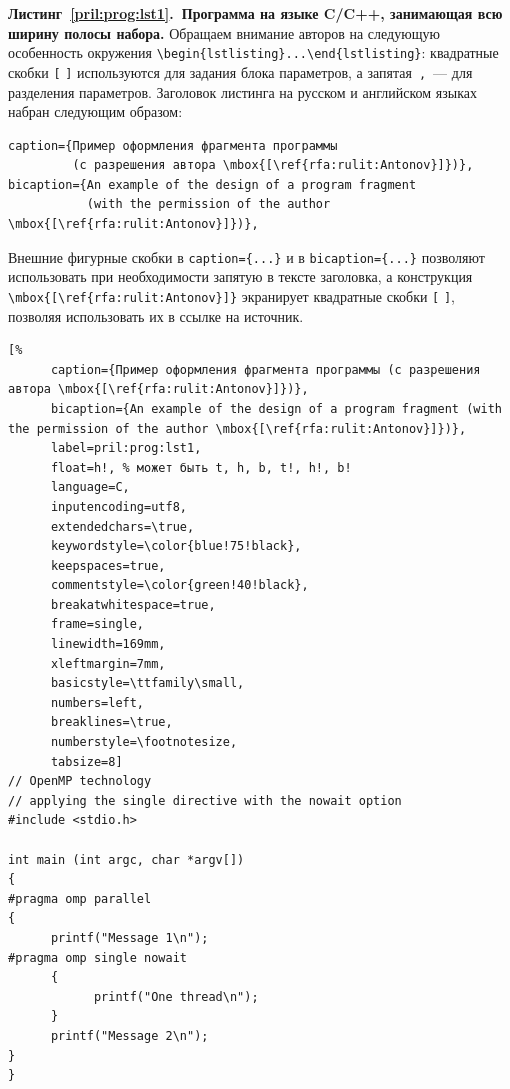 \documentclass[10pt,a4paper]{book}
\begin{document}
\bigskip

\MakeAuthorsInfoEN




\newpage
{}


\textbf{Листинг~\ref{pril:prog:lst1}.~Программа на языке C/C++, занимающая всю ширину 
полосы набора.} Обращаем внимание авторов на следующую особенность окружения
\verb!\begin{lstlisting}...\end{lstlisting}!:
квадратные скобки \verb![! \verb!]! используются для задания блока параметров,
а запятая~\verb!,!~--- для разделения параметров. Заголовок листинга на русском и 
английском языках набран следующим образом:
\begin{verbatim}
caption={Пример оформления фрагмента программы 
         (с разрешения автора \mbox{[\ref{rfa:rulit:Antonov}]})},
bicaption={An example of the design of a program fragment 
           (with the permission of the author \mbox{[\ref{rfa:rulit:Antonov}]})},
\end{verbatim}
Внешние фигурные скобки в \verb!caption={...}! и в \verb!bicaption={...}!
позволяют использовать при необходимости запятую в тексте заголовка,
а конструкция \verb!\mbox{[\ref{rfa:rulit:Antonov}]}! экранирует
квадратные скобки \verb![! \verb!]!, позволяя использовать их в ссылке 
на источник.
%
%
\begin{lstlisting}[%
      caption={Пример оформления фрагмента программы (с разрешения автора \mbox{[\ref{rfa:rulit:Antonov}]})},
      bicaption={An example of the design of a program fragment (with the permission of the author \mbox{[\ref{rfa:rulit:Antonov}]})},
      label=pril:prog:lst1,
      float=h!, % может быть t, h, b, t!, h!, b!
      language=C, 
      inputencoding=utf8, 
      extendedchars=\true, 
      keywordstyle=\color{blue!75!black}, 
      keepspaces=true, 
      commentstyle=\color{green!40!black}, 
      breakatwhitespace=true,
      frame=single, 
      linewidth=169mm,
      xleftmargin=7mm,
      basicstyle=\ttfamily\small,
      numbers=left,
      breaklines=\true, 
      numberstyle=\footnotesize,
      tabsize=8]
// OpenMP technology
// applying the single directive with the nowait option 
#include <stdio.h>

int main (int argc, char *argv[])
{
#pragma omp parallel
{
      printf("Message 1\n");
#pragma omp single nowait
      {
            printf("One thread\n");
      }
      printf("Message 2\n");
}
}
\end{lstlisting}
\end{document}
